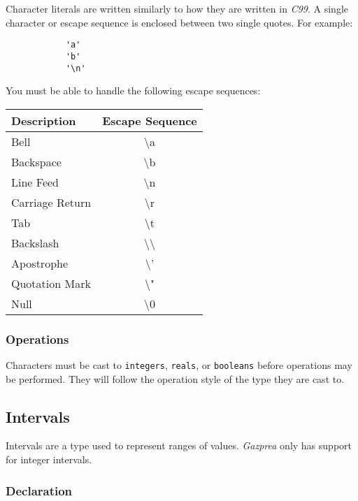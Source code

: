 \documentclass[../../gazprea.tex]{subfiles}
\begin{document}
		Character literals are written similarly to how they are written in \textit{C99}. A single character or escape
		sequence is enclosed between two single quotes. For example:

		\begin{lstlisting}
			'a'
			'b'
			'\n'
		\end{lstlisting}

		You must be able to handle the following escape sequences:

		\begin{center}
			\begin{tabular}{|l|c|}
				\hline
				\textbf{Description} & \textbf{Escape Sequence} \\
				\hline
				Bell            & \textbackslash{}a \\
				Backspace       & \textbackslash{}b \\
				Line Feed       & \textbackslash{}n \\
				Carriage Return & \textbackslash{}r \\
				Tab             & \textbackslash{}t \\
				Backslash       & \textbackslash{}\textbackslash{} \\
				Apostrophe      & \textbackslash{}' \\
				Quotation Mark  & \textbackslash{}" \\
				Null            & \textbackslash0   \\
				\hline
			\end{tabular}
		\end{center}

	\subsubsection{Operations}

		Characters must be cast to \texttt{integers}, \texttt{reals}, or \texttt{booleans} before operations may be
		performed. They will follow the operation style of the type they are cast to.


	\subsection{Intervals}\label{sec:interval}
		Intervals are a type used to represent ranges of values.
 		\textit{Gazprea} only has support for integer intervals.

	\subsubsection{Declaration}
\end{document}
